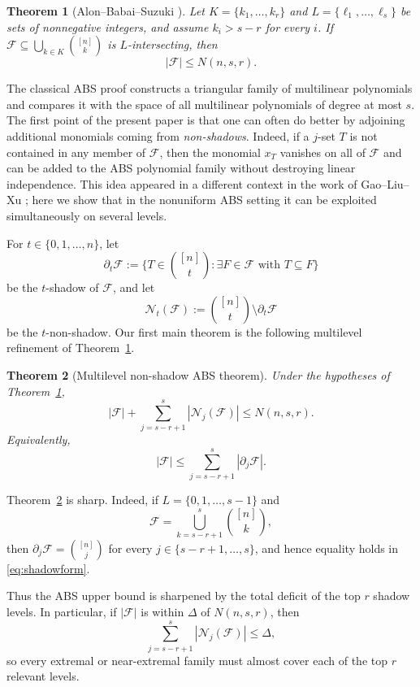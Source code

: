 \documentclass[11pt]{article}
\theoremstyle{plain}
\newtheorem{theorem}{Theorem}
\theoremstyle{remark}
\newcommand{\F}{\mathcal{F}}
\newcommand{\N}{\mathcal{N}}
\newcommand{\abs}[1]{\left|#1\right|}
\begin{document}
\begin{theorem}[Alon--Babai--Suzuki \cite{ABS}]\label{thm:ABS}
Let $K=\{k_1,\dots,k_r\}$ and $L=\{\ell_1,\dots,\ell_s\}$ be sets of nonnegative integers, and assume
$k_i>s-r$ for every $i$.
If $\F\subseteq \bigcup_{k\in K}\binom{[n]}{k}$ is $L$-intersecting, then
$$
  \abs{\F}\le N(n,s,r).
$$
\end{theorem}

The classical ABS proof constructs a triangular family of multilinear polynomials and compares it with the
space of all multilinear polynomials of degree at most $s$.
The first point of the present paper is that one can often do better by adjoining additional monomials
coming from \emph{non-shadows}.
Indeed, if a $j$-set $T$ is not contained in any member of $\F$, then the monomial $x_T$ vanishes on all of
$\F$ and can be added to the ABS polynomial family without destroying linear independence.
This idea appeared in a different context in the work of Gao--Liu--Xu \cite{GLX};
here we show that in the nonuniform ABS setting it can be exploited simultaneously on several levels.

For $t\in\{0,1,\dots,n\}$, let
$$
  \partial_t\F:=\{T\in\binom{[n]}{t}: \exists F\in\F\text{ with }T\subseteq F\}
$$
be the $t$-shadow of $\F$, and let
$$
  \N_t(\F):=\binom{[n]}{t}\setminus \partial_t\F
$$
be the $t$-non-shadow.
Our first main theorem is the following multilevel refinement of Theorem~\ref{thm:ABS}.

\begin{theorem}[Multilevel non-shadow ABS theorem]\label{thm:main}
Under the hypotheses of Theorem~\ref{thm:ABS},
\begin{equation}\label{eq:main}
  \abs{\F}+\sum_{j=s-r+1}^{s}\abs{\N_j(\F)}\le N(n,s,r).
\end{equation}
Equivalently,
\begin{equation}\label{eq:shadowform}
  \abs{\F}\le \sum_{j=s-r+1}^{s}\abs{\partial_j\F}.
\end{equation}
\end{theorem}
Theorem~\ref{thm:main} is sharp.
Indeed, if $L=\{0,1,\dots,s-1\}$ and
$$
  \F=\bigcup_{k=s-r+1}^{s}\binom{[n]}{k},
$$
then $\partial_j\F=\binom{[n]}{j}$ for every $j\in\{s-r+1,\dots,s\}$, and hence equality holds in
\eqref{eq:shadowform}.

Thus the ABS upper bound is sharpened by the total deficit of the top $r$ shadow levels.
In particular, if $\abs{\F}$ is within $\Delta$ of $N(n,s,r)$, then
$$
  \sum_{j=s-r+1}^{s}\abs{\N_j(\F)}\le \Delta,
$$
so every extremal or near-extremal family must almost cover each of the top $r$ relevant levels.
\end{document}
